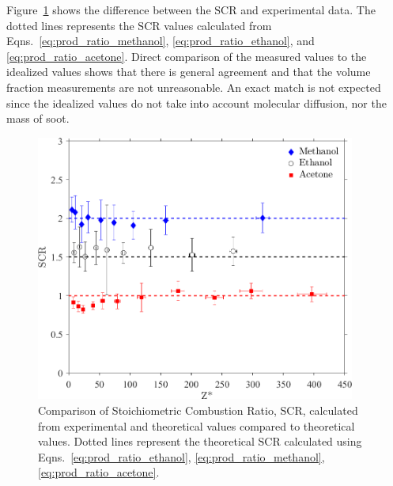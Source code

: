 \documentclass[12pt]{article}
\begin{document}
Figure~\ref{fig:SCR} shows the difference between the $\text{SCR}$ and experimental data. The dotted lines represents the $\text{SCR}$ values calculated from Eqns.~\ref{eq:prod_ratio_methanol}, \ref{eq:prod_ratio_ethanol}, and \ref{eq:prod_ratio_acetone}. Direct comparison of the measured values to the idealized values shows that there is general agreement and that the volume fraction measurements are not unreasonable. An exact match is not expected since the idealized values do not take into account molecular diffusion, nor the mass of soot.
\begin{figure}[h!]
	\centering
\includegraphics[width=10.5cm, keepaspectratio]{Prod_ratio_Comparison.png}
	\caption[Stoichiometric Combustion Ratio calculated from experimental values compared to theoretical values]{Comparison of Stoichiometric Combustion Ratio, $\text{SCR}$, calculated from experimental and theoretical values compared to theoretical values. Dotted lines represent the theoretical $\text{SCR}$ calculated using Eqns.~\ref{eq:prod_ratio_ethanol}, \ref{eq:prod_ratio_methanol}, \ref{eq:prod_ratio_acetone}.}
	\label{fig:SCR}
\end{figure}
\end{document}
